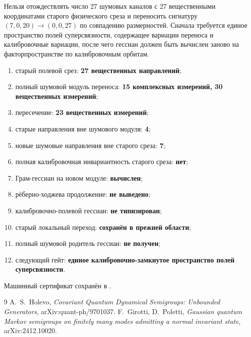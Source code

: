 \begin{nogocriterion}
Нельзя отождествлять число 27 шумовых каналов с 27 вещественными координатами
старого физического среза и переносить сигнатуру
$(7,0,20)\to(0,0,27)$ по совпадению размерностей. Сначала требуется единое
пространство полей суперсвязности, содержащее вариации переноса и калибровочные вариации,
после чего гессиан должен быть вычислен заново на факторпространстве по калибровочным орбитам.
\end{nogocriterion}

\begin{protocol}
\begin{enumerate}
 \item старый полевой срез: \textbf{27 вещественных направлений};
 \item полный шумовой модуль переноса: \textbf{15 комплексных измерений, 30 вещественных измерений};
 \item пересечение: \textbf{23 вещественных измерений};
 \item старые направления вне шумового модуля: \textbf{4};
 \item новые шумовые направления вне старого среза: \textbf{7};
 \item полная калибровочная инвариантность старого среза: \textbf{нет};
 \item Грам-гессиан на новом модуле: \textbf{вычислен};
 \item рёберно-ходжева продолжение: \textbf{не выведено};
 \item калибровочно-полевой гессиан: \textbf{не типизирован};
 \item старый локальный переход: \textbf{сохранён в прежней области};
 \item полный шумовой родитель гессиан: \textbf{не получен};
 \item следующий гейт: \textbf{единое калибровочно-замкнутое пространство
 полей суперсвязности}.
\end{enumerate}
\end{protocol}

Машинный сертификат сохранён в
.

\begin{thebibliography}{9}
A.~S.~Holevo,
\emph{Covariant Quantum Dynamical Semigroups: Unbounded Generators},
arXiv:quant-ph/9701037.
F.~Girotti, D.~Poletti,
\emph{Gaussian quantum Markov semigroups on finitely many modes admitting a
normal invariant state},
arXiv:2412.10020.
\end{thebibliography}